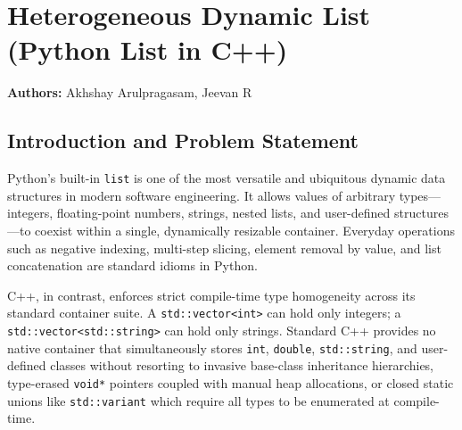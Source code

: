 \documentclass[12pt,a4paper]{report}
\begin{document}
\setcounter{chapter}{20}

\chapter{Heterogeneous Dynamic List (Python List in C++)}
\setcounter{chapter}{21}
\renewcommand{\thechapter}{21}
\renewcommand{\thesection}{21.\arabic{section}}
\renewcommand{\thesubsection}{21.\arabic{section}.\arabic{subsection}}
\renewcommand{\thetable}{21.\arabic{table}}
\renewcommand{\thefigure}{21.\arabic{figure}}
\textbf{Authors:} Akhshay Arulpragasam, Jeevan R

\vspace{1.5em}

\section{Introduction and Problem Statement}

Python's built-in \texttt{list} is one of the most versatile and ubiquitous dynamic data structures in modern software engineering. It allows values of arbitrary types---integers, floating-point numbers, strings, nested lists, and user-defined structures---to coexist within a single, dynamically resizable container. Everyday operations such as negative indexing, multi-step slicing, element removal by value, and list concatenation are standard idioms in Python.

C++, in contrast, enforces strict compile-time type homogeneity across its standard container suite. A \texttt{std::vector<int>} can hold only integers; a \texttt{std::vector<std::string>} can hold only strings. Standard C++ provides no native container that simultaneously stores \texttt{int}, \texttt{double}, \texttt{std::string}, and user-defined classes without resorting to invasive base-class inheritance hierarchies, type-erased \texttt{void*} pointers coupled with manual heap allocations, or closed static unions like \texttt{std::variant} which require all types to be enumerated at compile-time.
\end{document}
